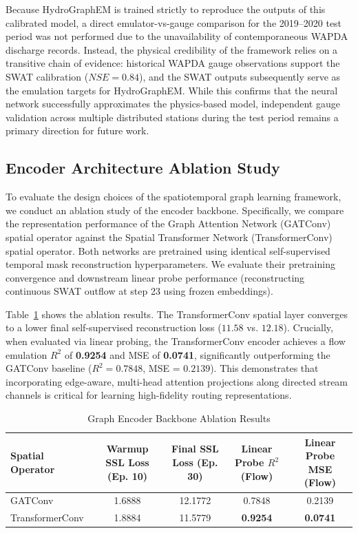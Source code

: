 \documentclass[preprint,12pt]{elsarticle}
\begin{document}
Because HydroGraphEM is trained strictly to reproduce the outputs of this calibrated model, a direct emulator-vs-gauge comparison for the 2019--2020 test period was not performed due to the unavailability of contemporaneous WAPDA discharge records. Instead, the physical credibility of the framework relies on a transitive chain of evidence: historical WAPDA gauge observations support the SWAT calibration ($NSE=0.84$), and the SWAT outputs subsequently serve as the emulation targets for HydroGraphEM. While this confirms that the neural network successfully approximates the physics-based model, independent gauge validation across multiple distributed stations during the test period remains a primary direction for future work.


\subsection{Encoder Architecture Ablation Study}
To evaluate the design choices of the spatiotemporal graph learning framework, we conduct an ablation study of the encoder backbone. Specifically, we compare the representation performance of the Graph Attention Network (GATConv) spatial operator against the Spatial Transformer Network (TransformerConv) spatial operator. Both networks are pretrained using identical self-supervised temporal mask reconstruction hyperparameters. We evaluate their pretraining convergence and downstream linear probe performance (reconstructing continuous SWAT outflow at step 23 using frozen embeddings).

Table~\ref{tab:ablation_encoder} shows the ablation results. The TransformerConv spatial layer converges to a lower final self-supervised reconstruction loss ($11.58$ vs. $12.18$). Crucially, when evaluated via linear probing, the TransformerConv encoder achieves a flow emulation $R^2$ of \textbf{0.9254} and MSE of \textbf{0.0741}, significantly outperforming the GATConv baseline ($R^2 = 0.7848$, MSE = $0.2139$). This demonstrates that incorporating edge-aware, multi-head attention projections along directed stream channels is critical for learning high-fidelity routing representations.

\begin{table}[H]
\centering
\caption{Graph Encoder Backbone Ablation Results}\label{tab:ablation_encoder}
\begin{tabular}{lcccc}
\toprule
Spatial Operator & Warmup SSL Loss (Ep. 10) & Final SSL Loss (Ep. 30) & Linear Probe $R^2$ (Flow) & Linear Probe MSE (Flow) \\
\midrule
GATConv & 1.6888 & 12.1772 & 0.7848 & 0.2139 \\
TransformerConv & 1.8884 & 11.5779 & \textbf{0.9254} & \textbf{0.0741} \\
\bottomrule
\end{tabular}
\end{table}
\end{document}
